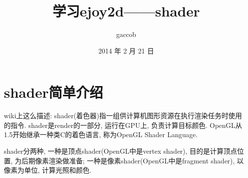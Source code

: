 

\title {\ZHH \huge 学习ejoy2d——shader}
\author {\small gaccob}
\date {\small 2014 年 2 月 21 日}
\maketitle


\section* {\ZHH shader简单介绍} {
    {wiki上这么描述: shader(着色器)指一组供计算机图形资源在执行渲染任务时使用的指令. shader是render的一部分, 运行在GPU上, 负责计算目标颜色. OpenGL从1.5开始继承一种类C的着色语言, 称为OpenGL Shader Language.}\par
    {shader分两种, 一种是顶点shader(OpenGL中是vertex shader), 目的是计算顶点位置, 为后期像素渲染做准备; 一种是像素shader(OpenGL中是fragment shader), 以像素为单位, 计算光照和颜色. }\par
}


